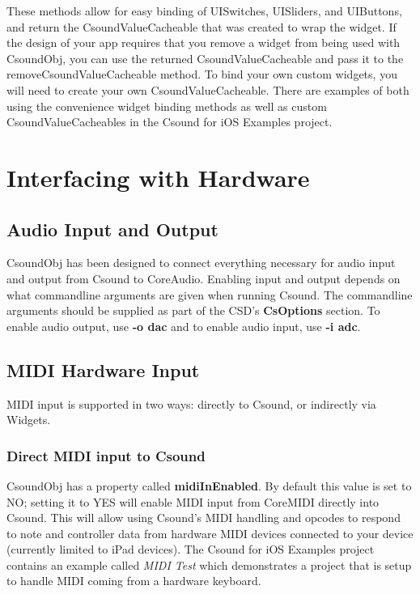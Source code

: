 \documentclass[11pt]{article}
\begin{document}
These methods allow for easy binding of UISwitches, UISliders, and UIButtons, and return the CsoundValueCacheable that was created to wrap the widget. If the design of your app requires that you remove a widget from being used with CsoundObj, you can use the returned CsoundValueCacheable and pass it to the removeCsoundValueCacheable method. To bind your own custom widgets, you will need to create your own CsoundValueCacheable.  There are examples of both using the convenience widget binding methods as well as custom CsoundValueCacheables in the Csound for iOS Examples project.


\section{Interfacing with Hardware}
\subsection{Audio Input and Output}

CsoundObj has been designed to connect everything necessary for audio input and output from Csound to CoreAudio.  Enabling input and output depends on what commandline arguments are given when running Csound.  The commandline arguments should be supplied as part of the CSD's \textbf{CsOptions} section.  To enable audio output, use \textbf{-o dac} and to enable audio input, use \textbf{-i adc}. 

\subsection{MIDI Hardware Input}

MIDI input is supported in two ways: directly to Csound, or indirectly via Widgets. 

\subsubsection{Direct MIDI input to Csound}

CsoundObj has a property called \textbf{midiInEnabled}.  By default this value is set to NO; setting it to YES will enable MIDI input from CoreMIDI directly into Csound. This will allow using Csound's MIDI handling and opcodes to respond to note and controller data from hardware MIDI devices connected to your device (currently limited to iPad devices).  The Csound for iOS Examples project contains an example called \emph{MIDI Test} which demonstrates a project that is setup to handle MIDI coming from a hardware keyboard.
\end{document}

